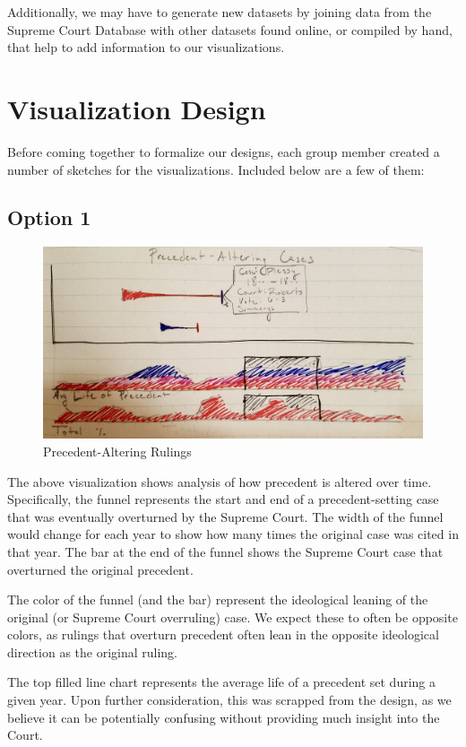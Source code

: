 \documentclass{article}
\begin{document}
Additionally, we may have to generate new datasets by joining data from the Supreme Court Database with other datasets found online, or compiled by hand, that help to add information to our visualizations.

\section{Visualization Design}
Before coming together to formalize our designs, each group member created a number of sketches for the visualizations.  Included below are a few of them:
\subsection{Option 1}
\begin{figure}[h!]
    \includegraphics[width=\linewidth]{pics/precedentalteration.jpg}
    \caption{Precedent-Altering Rulings}
    \label{fig:roughprecedent}
\end{figure}
\FloatBarrier
The above visualization shows analysis of how precedent is altered over time.  Specifically, the funnel represents the start and end of a precedent-setting case that was eventually overturned by the Supreme Court.  The width of the funnel would change for each year to show how many times the original case was cited in that year.  The bar at the end of the funnel shows the Supreme Court case that overturned the original precedent.

The color of the funnel (and the bar) represent the ideological leaning of the original (or Supreme Court overruling) case.  We expect these to often be opposite colors, as rulings that overturn precedent often lean in the opposite ideological direction as the original ruling.

The top filled line chart represents the average life of a precedent set during a given year.  Upon further consideration, this was scrapped from the design, as we believe it can be potentially confusing without providing much insight into the Court.
\end{document}
